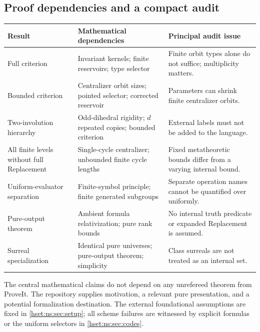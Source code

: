 \documentclass[11pt,letterpaper]{article}
\theoremstyle{definition}
\theoremstyle{remark}
\begin{document}
\subsection{Proof dependencies and a compact audit}
\label{hset:ns:app:audit}

\begin{center}
\small
\begin{tabularx}{\textwidth}{@{}>{\raggedright\arraybackslash}p{}>{\raggedright\arraybackslash}X>{\raggedright\arraybackslash}X@{}}
\toprule
Result & Mathematical dependencies & Principal audit issue\\
\midrule
Full criterion & Invariant kernels; finite reservoirs; type selector & Finite orbit types alone do not suffice; multiplicity matters.\\
Bounded criterion & Centralizer orbit sizes; pointed selector; corrected reservoir & Parameters can shrink finite centralizer orbits.\\
Two-involution hierarchy & Odd-dihedral rigidity; $d$ repeated copies; bounded criterion & External labels must not be added to the language.\\
All finite levels without full Replacement & Single-cycle centralizer; unbounded finite cycle lengths & Fixed metatheoretic bounds differ from a varying internal bound.\\
Uniform-evaluator separation & Finite-symbol principle; finite generated subgroups & Separate operation names cannot be quantified over uniformly.\\
Pure-output theorem & Ambient formula relativization; pure rank bounds & No internal truth predicate or expanded Replacement is assumed.\\
Surreal specialization & Identical pure universes; pure-output theorem; simplicity & Class surreals are not treated as an internal set.\\
\bottomrule
\end{tabularx}
\end{center}

The central mathematical claims do not depend on any unrefereed theorem from ProveIt. The repository supplies motivation, a relevant pure presentation, and a potential formalization destination. The external foundational assumptions are fixed in \cref{hset:ns:sec:setup}; all scheme failures are witnessed by explicit formulas or the uniform selectors in \cref{hset:ns:sec:codes}.
\end{document}
